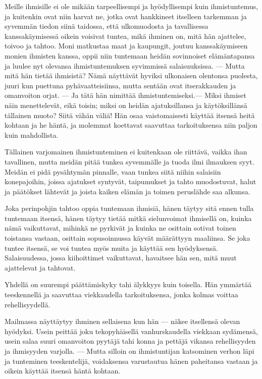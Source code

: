 \documentclass[11pt, twoside, finnish, a5paper]{book}
\begin{document}
Meille ihmisille ei ole mikään tarpeellisempi ja hyödyllisempi 
kuin ihmistuntemus, ja kuitenkin ovat niin
harvat ne, jotka ovat hankkineet itselleen tarkemman ja
syvemmän tiedon siinä taidossa, että ulkomuodosta ja
tavallisessa kanssakäymisessä oikein voisivat tuntea,
mikä ihminen on, mitä hän ajattelee, toivoo ja tahtoo.
Moni matkustaa maat ja kaupungit, joutuu 
kanssakäymiseen monien ihmisten kanssa, oppii niin tuntemaan
heidän sovinnoiset elämäntapansa ja luulee nyt olevansa
ihmistuntemuksen syvimmissä salaisuuksissa. — Mutta
mitä hän tietää ihmisistä?
Nämä näyttävät hyviksi ulkonaisen olentonsa puolesta,
juuri kun puettuna pyhävaatteisiinsa, mutta sentään ovat
itserakkauden ja omanvoiton orjat. — Ja tätä hän nimittää
ihmistuntemiseksi.— Miksi ihmiset näin menettelevät, eikä toisin;
miksi on heidän ajatuksillansa ja käytöksillänsä
tällainen muoto? Siitä vähän väliä! Hän osaa vaistomaisesti käyttää
itsensä heitä kohtaan ja he häntä, ja molemmat
koettavat saavuttaa tarkoituksensa niin paljon kuin
mahdollista.

Tällainen varjomainen ihmistunteminen ei kuitenkaan
ole riittävä, vaikka ihan tavallinen, mutta meidän pitää tunkea
syvemmälle ja tuoda ilmi ilmauksen syyt. Meidän ei pidä
pysähtymän pinnalle, vaan tunkea siitä niihin salaisiin konepajoihin,
joissa ajatukset syntyvät, taipumukset ja tahto muodostuvat,
halut ja päätökset lähtevät ja joista kaiken elämän
ja toimen peruslähde saa alkunsa.

Joka perinpohjin tahtoo oppia tuntemaan ihmisiä,
hänen täytyy sitä ennen tulla tuntemaan itsensä, hänen
täytyy tietää mitkä sielunvoimat ihmisellä on, kuinka
nämä vaikuttavat, mihinkä ne pyrkivät ja kuinka ne
osittain sotivat toinen toistansa vastaan, osittain
sopusoinnussa käyvät määrättyyn maaliinsa. Se joka tuntee
itsensä, se voi tuntea myös muita ja käyttää sen hyödyksensä.
Salaisuudessa, jossa kiihoittimet vaikuttavat,
havaitsee hän sen, mitä muut ajattelevat ja tahtovat.

Yhdellä on suurempi päättämiskyky tahi älykkyys
kuin toisella. Hän ymmärtää teeskennellä ja saavuttaa
viekkaudella tarkoituksensa, jonka kolmas 
voittaa rehellisyydellä.

Mailmassa näyttäytyy ihminen sellaisena kun hän
— näkee itsellensä olevan hyödyksi. Usein peittää joku
tekopyhäisellä vanhurskaudella viekkaan sydämensä,
usein salaa suuri omanvoiton pyytäjä tahi konna ja
pettäjä vikansa rehellisyyden ja ihmisyyden varjolla. —
Mutta silloin on ihmistuntijan katsominen verhon läpi
ja tunteminen teeskentelijä, voidaksensa varustautua
hänen paheitansa vastaan ja oikein käyttää itsensä
häntä kohtaan.
\end{document}
